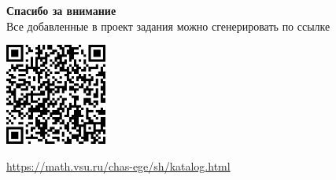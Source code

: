 \documentclass[aspectratio=169,12pt]{beamer}
\begin{document}
\begin{frame}
	\center\large\textcolor{NordBrightBlue}{\textbf{Спасибо за внимание}}\\
	\hfill \break
	\normalsize
	Все добавленные в проект задания можно сгенерировать по ссылке\\
	\hfill \break

	\includegraphics[width=0.25\textwidth]{images/QR-code}\\
	\hfill \break

	\url{https://math.vsu.ru/chas-ege/sh/katalog.html}
\end{frame}
\end{document}
